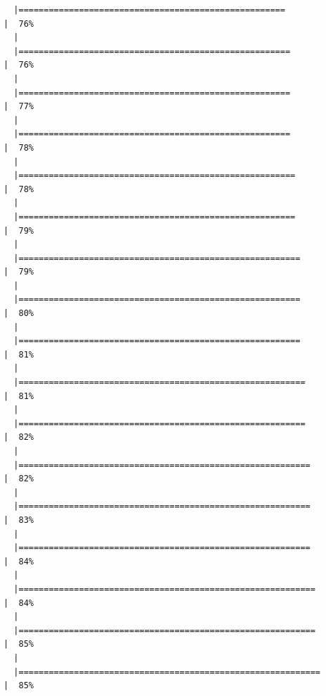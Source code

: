 \documentclass[
  letterpaper,
  DIV=11,
  numbers=noendperiod]{scrreprt}
\begin{document}
\begin{verbatim}
  |=====================================================                 |  76%
  |                                                                            
  |======================================================                |  76%
  |                                                                            
  |======================================================                |  77%
  |                                                                            
  |======================================================                |  78%
  |                                                                            
  |=======================================================               |  78%
  |                                                                            
  |=======================================================               |  79%
  |                                                                            
  |========================================================              |  79%
  |                                                                            
  |========================================================              |  80%
  |                                                                            
  |========================================================              |  81%
  |                                                                            
  |=========================================================             |  81%
  |                                                                            
  |=========================================================             |  82%
  |                                                                            
  |==========================================================            |  82%
  |                                                                            
  |==========================================================            |  83%
  |                                                                            
  |==========================================================            |  84%
  |                                                                            
  |===========================================================           |  84%
  |                                                                            
  |===========================================================           |  85%
  |                                                                            
  |============================================================          |  85%

\end{verbatim}
\end{document}
